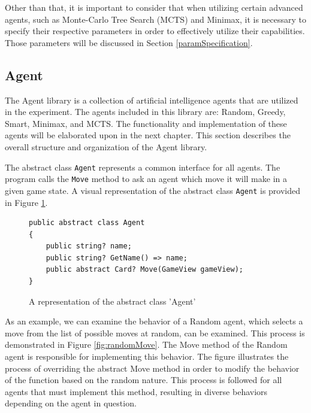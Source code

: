 Other than that, it is important to consider that when utilizing certain advanced agents, such as Monte-Carlo Tree Search (MCTS) and Minimax, it is necessary to specify their respective parameters in order to effectively utilize their capabilities. Those parameters will be discussed in Section \ref{paramSpecification}.

\subsection{Agent}

The Agent library is a collection of artificial intelligence agents that are utilized in the experiment. The agents included in this library are: Random, Greedy, Smart, Minimax, and MCTS. The functionality and implementation of these agents will be elaborated upon in the next chapter. This section describes the overall structure and organization of the Agent library.

The abstract class \texttt{Agent} represents a common interface for all agents. The program calls the \texttt{Move} method to ask an agent which move it will make in a given game state. A visual representation of the abstract class \texttt{Agent} is provided in Figure \ref{fig:abstractClass}.

\begin{figure}[h]
\captionsetup{justification=centering}
\begin{lstlisting}
public abstract class Agent
{
    public string? name;
    public string? GetName() => name;
    public abstract Card? Move(GameView gameView);
}
\end{lstlisting}
\caption{A representation of the abstract class 'Agent'}
\label{fig:abstractClass}
\end{figure}

As an example, we can examine the behavior of a Random agent, which selects a move from the list of possible moves at random, can be examined. This process is demonstrated in Figure \ref{fig:randomMove}. The Move method of the Random agent is responsible for implementing this behavior. The figure illustrates the process of overriding the abstract Move method in order to modify the behavior of the function based on the random nature. This process is followed for all agents that must implement this method, resulting in diverse behaviors depending on the agent in question.